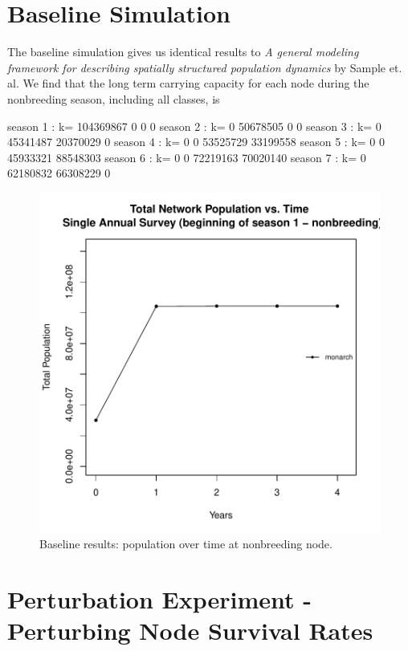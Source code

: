 \documentclass[10pt]{article}
\begin{document}
\section{Baseline Simulation}
% 
The baseline simulation gives us identical results to {\it{A general modeling framework for describing spatially
structured population dynamics}} by Sample et. al. We find that the long term carrying capacity for each node during the nonbreeding season, including all classes, is

\begin{Schunk}
\begin{Soutput}
season 1 : k= 104369867 0 0 0
season 2 : k= 0 50678505 0 0
season 3 : k= 0 45341487 20370029 0
season 4 : k= 0 0 53525729 33199558
season 5 : k= 0 0 45933321 88548303
season 6 : k= 0 0 72219163 70020140
season 7 : k= 0 62180832 66308229 0
\end{Soutput}
\end{Schunk}



\begin{figure}[H]
\begin{center}
\includegraphics[width=.7\textwidth, height=.6\textwidth]{RGraphics-monarchbaseline}
\caption{Baseline results: population over time at nonbreeding node.}\label{fig:monarchbaseline}
\end{center}
\end{figure}

\clearpage


\section{Perturbation Experiment - Perturbing Node Survival Rates}
\end{document}
